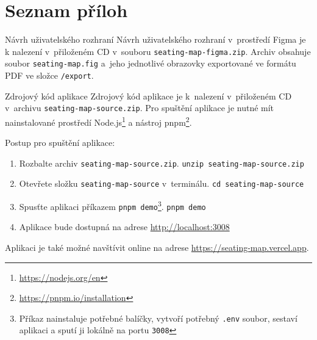 \appendix
{}
\chapter*{Seznam příloh}
\renewcommand{\thesection}{Příloha \Alph{section}}

\begin{section}{Návrh uživatelského rozhraní}
    \label{appendix:ui-design}
    Návrh uživatelského rozhraní v~prostředí Figma je k nalezení v~přiloženém CD v~souboru \texttt{seating-map-figma.zip}.
    Archiv obsahuje soubor \texttt{seating-map.fig} a~jeho jednotlivé obrazovky exportované ve formátu PDF ve složce \texttt{/export}.
\end{section}
\newpage

\begin{section}{Zdrojový kód aplikace}
    \label{appendix:source-code}
    Zdrojový kód aplikace je k~nalezení v~přiloženém CD v~archivu \texttt{seating-map-source.zip}.
    Pro spuštění aplikace je nutné mít nainstalované prostředí Node.js\footnote{\url{https://nodejs.org/en}} a nástroj pnpm\footnote{\url{https://pnpm.io/installation}}.

    Postup pro spuštění aplikace:

    \begin{enumerate}
        \item Rozbalte archiv \texttt{seating-map-source.zip}.
        \subitem \texttt{unzip seating-map-source.zip}
        \item Otevřete složku \texttt{seating-map-source} v~terminálu.
        \subitem \texttt{cd seating-map-source}
        \item Spusťte aplikaci příkazem \texttt{pnpm demo}\footnote{Příkaz nainstaluje potřebné balíčky, vytvoří potřebný \texttt{.env} soubor, sestaví aplikaci a sputí ji lokálně na portu \texttt{3008}}.
        \subitem \texttt{pnpm demo}
        \item Aplikace bude dostupná na adrese \url{http://localhost:3008}
    \end{enumerate}

    Aplikaci je také možné navštívit online na adrese \url{https://seating-map.vercel.app}.
\end{section}
